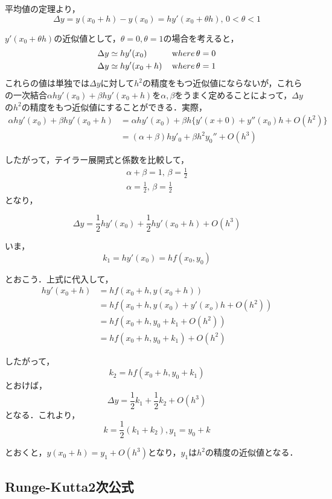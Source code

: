 \documentclass[11pt,dvipdfmx]{jsarticle}
\begin{document}
平均値の定理より， \[
\Delta y = y(x_0+h)-y(x_0) = hy'(x_0 + \theta h), \, 0<\theta<1
\]

\(y'(x_0 +\theta h)\)の近似値として，\(\theta=0, \theta=1\)の場合を考えると，
\[
\begin{aligned}
\Delta y &\simeq hy'(x_0) \, &{\textrm where}\, &\theta=0\\
\Delta y &\simeq hy'(x_0+h)  \, &{\textrm where}\, &\theta=1
\end{aligned}
\]
これらの値は単独では\(\Delta y\)に対して\(h^2\)の精度をもつ近似値にならないが，これらの一次結合\(\alpha h y'(x_0)+\beta hy'(x_0+h)\)を\(\alpha, \beta\)をうまく定めることによって，\(\Delta y\)の\(h^2\)の精度をもつ近似値にすることができる．実際，
\[
\begin{aligned}
\alpha h y'(x_0)+\beta hy'(x_0+h) & =\alpha h y'(x_0)+\beta h \{y'(x+0)+y''(x_0)h+O(h^2)\} \\
& =(\alpha+\beta)hy'_0 + \beta h^2 y_0'' + O(h^3)
\end{aligned}
\]

したがって，テイラー展開式と係数を比較して， \[
\begin{aligned}
\alpha + \beta = 1, \, \beta = \frac{1}{2}\\
\alpha = \frac{1}{2}, \, \beta =\frac{1}{2}
\end{aligned}\] となり，

\[
\Delta y = \frac{1}{2}hy'(x_0) + \frac{1}{2}hy'(x_0+h)+O(h^3)
\]

いま， \[
k_1 =hy'(x_0) =hf(x_0,y_0)
\]

とおこう．上式に代入して， \[
\begin{aligned}
hy'(x_0+h) &= hf(x_0+h,y(x_0+h)) \\
& =hf(x_0+h, y(x_0)+y'(x_o)h+O(h^2)) \\
& =hf(x_0+h, y_0+k_1+O(h^2)) \\
& =hf(x_0+h, y_0+k_1)+O(h^2)
\end{aligned}\]

したがって， \[
k_2 = hf(x_0+h, y_0+k_1)
\] とおけば， \[
\Delta y = \frac{1}{2}k_1 + \frac{1}{2}k_2 + O(h^3)
\] となる．これより， \[
k = \frac{1}{2}(k_1+k_2), y_1 = y_0 +k
\]

とおくと，\(y(x_0+h) = y_1+O(h^3)\)となり，\(y_1\)は\(h^2\)の精度の近似値となる．

    \subsection{Runge-Kutta2次公式}\label{runge-kutta2ux6b21ux516cux5f0f}
\end{document}
